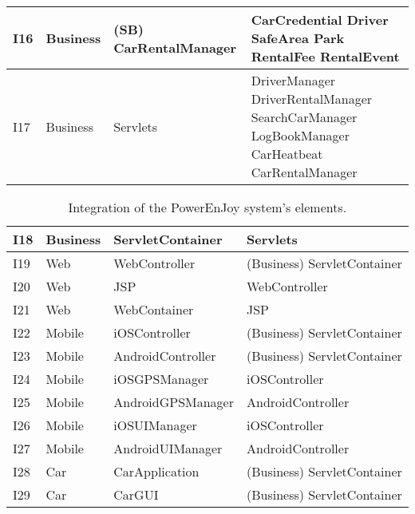 \begin{table}[H]
\begin{small}
\begin{tabular}{| l | l | p{} | p{} |}
    \hline
     I16 & Business & (SB) CarRentalManager & CarCredential \newline Driver \newline SafeArea  \newline Park \newline RentalFee  \newline RentalEvent \\
    \hline
    I17  & Business & Servlets & DriverManager \newline DriverRentalManager \newline SearchCarManager \newline LogBookManager \newline CarHeatbeat \newline CarRentalManager\\
    \hline
    \end{tabular}
    \end{small}
    \label{elements sequence 1}
\end{table}

\begin{table}[H]
    \centering
    \begin{small}
    \begin{tabular}{| l | l | p{} | p{} |}
    \hline
    I18 & Business & ServletContainer & Servlets \\
    \hline
    I19  & Web & WebController & (Business) ServletContainer\\
    \hline
    I20 & Web & JSP & WebController\\
    \hline
    I21 & Web & WebContainer & JSP\\
    \hline
    I22  & Mobile & iOSController & (Business) ServletContainer\\
    \hline
    I23  & Mobile & AndroidController & (Business) ServletContainer\\
    \hline
    I24  & Mobile & iOSGPSManager & iOSController\\
    \hline
    I25  & Mobile & AndroidGPSManager & AndroidController\\
    \hline
    I26  & Mobile & iOSUIManager & iOSController\\
    \hline
    I27  & Mobile & AndroidUIManager & AndroidController\\
    \hline   
    I28  & Car & CarApplication & (Business) ServletContainer\\
    \hline   
    I29  & Car & CarGUI & (Business) ServletContainer\\
    \hline 
    \end{tabular}
    \end{small}
    \caption{Integration of the PowerEnJoy system's elements.}
    \label{elements sequence 2}
\end{table}

